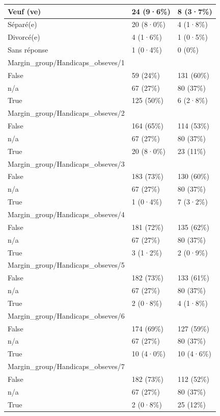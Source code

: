 \documentclass[
]{book}
\begin{document}
\begin{tabular}{l|l|l}
\hline
Veuf (ve) & 24 (9·6\%) & 8 (3·7\%)\\
\hline
Séparé(e) & 20 (8·0\%) & 4 (1·8\%)\\
\hline
Divorcé(e) & 4 (1·6\%) & 1 (0·5\%)\\
\hline
Sans réponse & 1 (0·4\%) & 0 (0\%)\\
\hline
Margin\_group/Handicaps\_obseves/1 &  & \\
\hline
False & 59 (24\%) & 131 (60\%)\\
\hline
n/a & 67 (27\%) & 80 (37\%)\\
\hline
True & 125 (50\%) & 6 (2·8\%)\\
\hline
Margin\_group/Handicaps\_obseves/2 &  & \\
\hline
False & 164 (65\%) & 114 (53\%)\\
\hline
n/a & 67 (27\%) & 80 (37\%)\\
\hline
True & 20 (8·0\%) & 23 (11\%)\\
\hline
Margin\_group/Handicaps\_obseves/3 &  & \\
\hline
False & 183 (73\%) & 130 (60\%)\\
\hline
n/a & 67 (27\%) & 80 (37\%)\\
\hline
True & 1 (0·4\%) & 7 (3·2\%)\\
\hline
Margin\_group/Handicaps\_obseves/4 &  & \\
\hline
False & 181 (72\%) & 135 (62\%)\\
\hline
n/a & 67 (27\%) & 80 (37\%)\\
\hline
True & 3 (1·2\%) & 2 (0·9\%)\\
\hline
Margin\_group/Handicaps\_obseves/5 &  & \\
\hline
False & 182 (73\%) & 133 (61\%)\\
\hline
n/a & 67 (27\%) & 80 (37\%)\\
\hline
True & 2 (0·8\%) & 4 (1·8\%)\\
\hline
Margin\_group/Handicaps\_obseves/6 &  & \\
\hline
False & 174 (69\%) & 127 (59\%)\\
\hline
n/a & 67 (27\%) & 80 (37\%)\\
\hline
True & 10 (4·0\%) & 10 (4·6\%)\\
\hline
Margin\_group/Handicaps\_obseves/7 &  & \\
\hline
False & 182 (73\%) & 112 (52\%)\\
\hline
n/a & 67 (27\%) & 80 (37\%)\\
\hline
True & 2 (0·8\%) & 25 (12\%)\\

\end{tabular}
\end{document}
